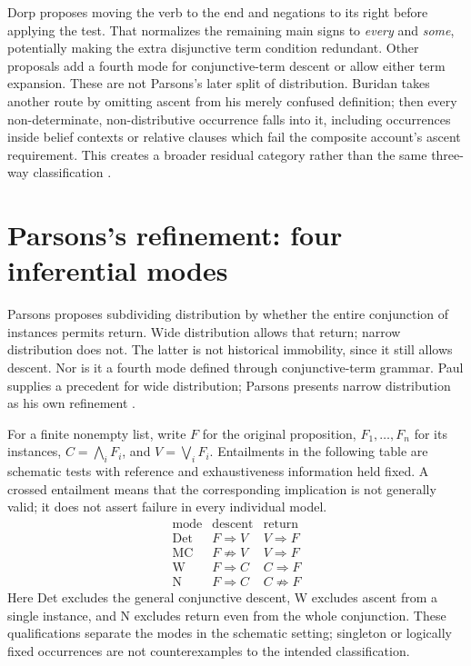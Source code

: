 Dorp proposes moving the verb to the end and negations to its right
before applying the test. That normalizes the remaining main signs to
\emph{every} and \emph{some}, potentially making the extra disjunctive
term condition redundant. Other proposals add a fourth mode for
conjunctive-term descent or allow either term expansion. These are not
Parsons's later split of distribution. Buridan takes another route by
omitting ascent from his merely confused definition; then every
non-determinate, non-distributive occurrence falls into it, including
occurrences inside belief contexts or relative clauses which fail the
composite account's ascent requirement. This creates a broader residual
category rather than the same three-way classification
\cite[pp.~265--266]{Parsons2007FordhamSupposition}.

\section{Parsons's refinement: four inferential modes}
\label{sec:p13-supposition-refinement}

Parsons proposes subdividing distribution by whether the entire
conjunction of instances permits return. Wide distribution allows
that return; narrow distribution does not. The latter is not historical
immobility, since it still allows descent. Nor is it a fourth mode
defined through conjunctive-term grammar. Paul supplies a precedent for
wide distribution; Parsons presents narrow distribution as his own
refinement \cite[pp.~266--268]{Parsons2007FordhamSupposition}.

For a finite nonempty list, write \(F\) for the original proposition,
\(F_1,\ldots,F_n\) for its instances, \(C=\bigwedge_iF_i\), and
\(V=\bigvee_iF_i\). Entailments in the following table are schematic
tests with reference and exhaustiveness information held fixed. A
crossed entailment means that the corresponding implication is not
generally valid; it does not assert failure in every individual model.
\[
\begin{array}{l|cc}
\text{mode}&\text{descent}&\text{return}\\\hline
\mathrm{Det}&F\Rightarrow V&V\Rightarrow F\\
\mathrm{MC}&F\not\Rightarrow V&V\Rightarrow F\\
\mathrm{W}&F\Rightarrow C&C\Rightarrow F\\
\mathrm{N}&F\Rightarrow C&C\not\Rightarrow F
\end{array}
\]
Here Det excludes the general conjunctive descent, W excludes ascent
from a single instance, and N excludes return even from the whole
conjunction. These qualifications separate the modes in the schematic
setting; singleton or logically fixed occurrences are not counterexamples
to the intended classification.

